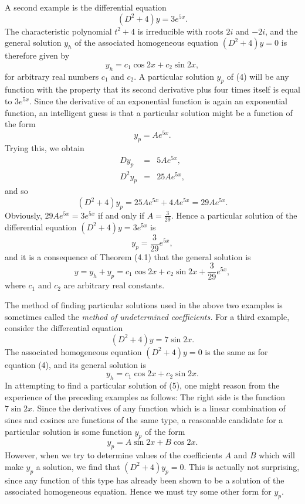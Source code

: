 A second example is the differential equation 
\begin{equation}
(D^2 + 4)y = 3e^{5x} .  
\label{eq11.5.4}
\end{equation}
The characteristic polynomial $t^2 + 4$ is irreducible with roots $2i$ and $-2i$, and the general solution $y_h$ of the associated homogeneous equation $(D^2 + 4)y = 0$ is therefore given by
$$
y_h = c_1 \cos 2x + c_2 \sin 2x,
$$
for arbitrary real numbers $c_1$ and $c_2$. A particular solution $y_p$ of (4) will be any function with the property that its second derivative plus four times itself is equal to $3e^{5x}$. Since the derivative of an exponential function is again an exponential function, an intelligent guess is that a particular solution might be a function of the form 
$$
y_p = Ae^{5x}.
$$
Trying this, we obtain
\begin{eqnarray*}
Dy_p &=& 5Ae^{5x},\\
D^2y_p &=& 25Ae^{5x},
\end{eqnarray*}
and so
$$
(D^2 + 4)y_p = 25Ae^{5x} + 4Ae^{5x} = 29Ae^{5x}.
$$
Obviously, $29Ae^{5x} = 3e^{5x}$ if and only if $A = \frac{3}{29}$. Hence a particular solution of the differential equation $(D^2 + 4)y = 3e^{5x}$ is
$$
y_p = \frac{3}{29} e^{5x}, 
$$
and it is a consequence of Theorem (4.1) that the general solution is
$$
y = y_h + y_p = c_1 \cos 2x + c_2 \sin 2x + \frac{3}{29} e^{5x},
$$
where $c_1$ and $c_2$ are arbitrary real constants.

The method of finding particular solutions used in the above two examples is sometimes called the \textit{method of undetermined coefficients.}  For a third example, consider the differential equation
\begin{equation}
(D^2 + 4)y = 7 \sin 2x. 
\label{eq11.5.5}
\end{equation}
The associated homogeneous equation $(D^2 + 4)y = 0$ is the same as for equation (4), and its general solution is
$$
y_h = c_1 \cos 2x + c_2 \sin 2x.
$$
In attempting to find a particular solution of (5), one might reason from the experience of the preceding examples as follows: The right side is the function $7 \sin 2x$. Since the derivatives of any function which is a linear combination of sines and cosines are functions of the same type, a reasonable candidate for a particular solution is some function $y_p$ of the form
$$
y_p = A \sin 2x + B \cos 2x.
$$
However, when we try to determine values of the coefficients $A$ and $B$ which will make $y_p$ a solution, we find that $(D^2 + 4)y_p = 0$. This is actually not surprising, since any function of this type has already been shown to be a solution of the associated homogeneous equation. Hence we must try some other form for $y_p$.

